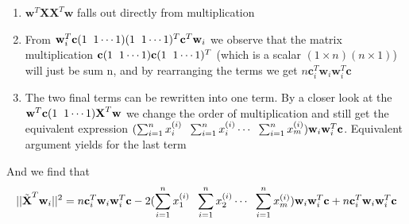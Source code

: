 \documentclass[a4paper,norsk]{article}
\begin{document}
\begin{enumerate}
\item $\textbf{w}^T \textbf{X}\textbf{X}^T\textbf{w}$ falls out directly from multiplication
\item From $\textbf{w}_i^T\textbf{c}(1 \hspace{2mm} 1 \cdots 1)(1 \hspace{2mm} 1 \cdots 1)^T \textbf{c}^T \textbf{w}_i$ \newline 
we observe that the matrix multiplication $\textbf{c}(1 \hspace{2mm} 1 \cdots 1) \textbf{c}(1 \hspace{2mm} 1 \cdots 1)^T$ \newline(which is a scalar $(1 \times n) (n \times 1)$)
will just be sum n, and by rearranging the terms we get $n\textbf{c}_i^T \textbf{w}_i \textbf{w}_i^T \textbf{c}$
\item The two final terms can be rewritten into one term. By a closer look at the $\textbf{w}^T \textbf{c}(1 \hspace{2mm} 1 \cdots 1)\textbf{X}^T \textbf{w}$ we change the order
of multiplication and still get the equivalent expression \newline 
$(\sum_{i=1}^n x_i^{(i)} \hspace{2mm} \sum_{i=1}^n x_i^{(i)} \cdots \hspace{2mm} \sum_{i=1}^n x_m^{(i)})\textbf{w}_i\textbf{w}_i^T\textbf{c}$. Equivalent argument yields for the last term
\end{enumerate}

And we find that
\begin{align*}
||\tilde{\textbf{X}}^T \textbf{w}_i ||^2 = n\textbf{c}_i^T \textbf{w}_i \textbf{w}_i^T \textbf{c} - 
2(\sum_{i=1}^n x_1^{(i)} \hspace{2mm} \sum_{i=1}^n x_2^{(i)} \cdots \hspace{2mm} \sum_{i=1}^n x_m^{(i)})\textbf{w}_i\textbf{w}_i^T\textbf{c} +
n\textbf{c}_i^T \textbf{w}_i \textbf{w}_i^T \textbf{c}
\end{align*}
\end{document}
